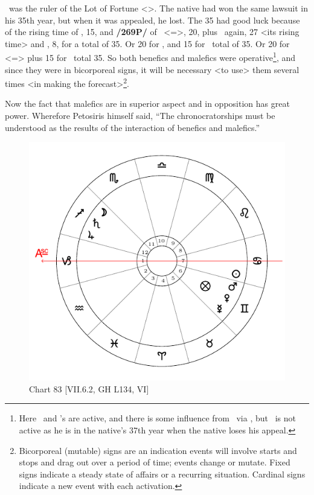 \Venus\, was the ruler of the Lot of Fortune <\Libra>. The native had won the same lawsuit in his 35th year, but when it was appealed, he lost. The 35 had good luck because of the rising time of \Pisces, 15, and \textbf{/269P/} of \Gemini\, <=\Mercury>, 20, plus \Gemini\, again, 27 <its rising time> and \Venus, 8, for a total of 35. Or 20 for \Gemini, and 15 for \Mars\, total of 35. Or 20 for \Virgo\, <=\Mercury> plus 15 for \Mars\, total 35. So both benefics and malefics were operative\footnote{Here \Venus\, and \Mars's are active, and there is some influence from \Jupiter\, via \Pisces, but \Saturn\, is not active as he is in the native's 37th year when the native loses his appeal.}, and since they were in bicorporeal signs, it will be necessary <to use> them several times <in making the forecast>\footnote{Bicorporeal (mutable) signs are an indication events will involve starts and stops and drag out over a period of time; events change or mutate. Fixed signs indicate a steady state of affairs or a recurring situation. Cardinal signs indicate a new event with each activation.}. 

Now \mndl the fact that malefics are in superior aspect and in opposition has great power. Wherefore Petosiris himself said, “The chronocratorships must be understood as the results of the interaction of benefics and malefics.” 

\newpage
\begin{figure}
\centering
\vspace{0pt}
\includegraphics[width=.68\textwidth]{charts/7_6_02}
\caption{Chart 83 [VII.6.2, GH L134, VI]}
\label{fig:chart83}
\end{figure} 

